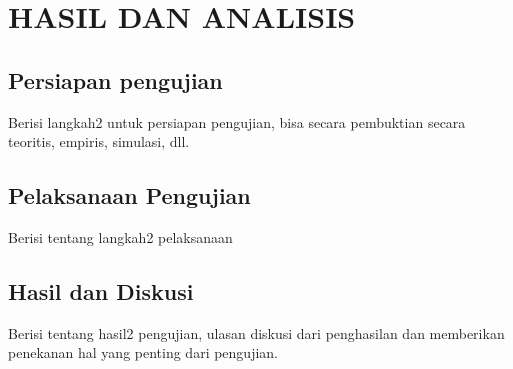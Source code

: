 
\chapter{HASIL DAN ANALISIS}
\label{cha:4-HasilDiskusi}

\section{Persiapan pengujian}
\label{sec:4-PersiapanPengujian}

Berisi langkah2 untuk persiapan pengujian, bisa secara pembuktian secara teoritis, empiris, simulasi, dll.

\section{Pelaksanaan Pengujian}
\label{sec:4-PelaksanaanPengujian}

Berisi tentang langkah2 pelaksanaan

\section{Hasil dan Diskusi}
\label{sec:4-HasilDiskusi}
Berisi tentang hasil2 pengujian, ulasan diskusi dari penghasilan dan memberikan penekanan hal yang penting dari pengujian.
